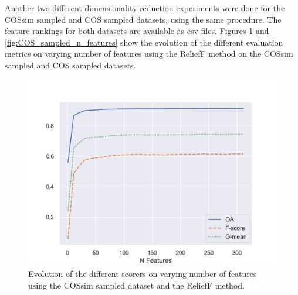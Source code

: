 \documentclass[12pt, english, openany]{book}
\begin{document}

Another two different dimensionality reduction experiments were done for the
COSsim sampled and COS sampled datasets, using the same procedure. The feature
rankings for both datasets are available as csv files. Figures
\ref{fig:COSsim_n_features} and \ref{fig:COS_sampled_n_features} show the evolution of the
different evaluation metrics on varying number of features using the ReliefF
method on the COSsim sampled and COS sampled datasets.

\begin{figure}[H]
  \centering
  \includegraphics[width=.6\linewidth]{COSsim_n_features.png}
  \caption[Evolution of the different scorers on varying number of features (COSsim
    sampled dataset).]{
    Evolution of the different scorers on varying number of features using the
    COSsim sampled dataset and the ReliefF method.}
  \label{fig:COSsim_n_features}
\end{figure}
\end{document}
